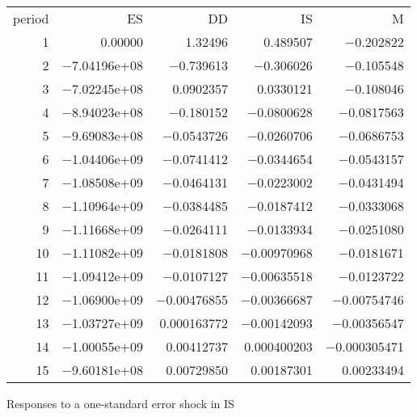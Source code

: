 \documentclass[11pt]{article}
\begin{document}
\begin{longtable}{rrrrr}
period &  ES &  DD &  IS &  M \\
1 & 0.00000 & 1.32496 & 0.489507 & $-$0.202822\\
2 & $-$7.04196\textrm{e+08} & $-$0.739613 & $-$0.306026 & $-$0.105548\\
3 & $-$7.02245\textrm{e+08} & 0.0902357 & 0.0330121 & $-$0.108046\\
4 & $-$8.94023\textrm{e+08} & $-$0.180152 & $-$0.0800628 & $-$0.0817563\\
5 & $-$9.69083\textrm{e+08} & $-$0.0543726 & $-$0.0260706 & $-$0.0686753\\
6 & $-$1.04406\textrm{e+09} & $-$0.0741412 & $-$0.0344654 & $-$0.0543157\\
7 & $-$1.08508\textrm{e+09} & $-$0.0464131 & $-$0.0223002 & $-$0.0431494\\
8 & $-$1.10964\textrm{e+09} & $-$0.0384485 & $-$0.0187412 & $-$0.0333068\\
9 & $-$1.11668\textrm{e+09} & $-$0.0264111 & $-$0.0133934 & $-$0.0251080\\
10 & $-$1.11082\textrm{e+09} & $-$0.0181808 & $-$0.00970968 & $-$0.0181671\\
11 & $-$1.09412\textrm{e+09} & $-$0.0107127 & $-$0.00635518 & $-$0.0123722\\
12 & $-$1.06900\textrm{e+09} & $-$0.00476855 & $-$0.00366687 & $-$0.00754746\\
13 & $-$1.03727\textrm{e+09} & 0.000163772 & $-$0.00142093 & $-$0.00356547\\
14 & $-$1.00055\textrm{e+09} & 0.00412737 & 0.000400203 & $-$0.000305471\\
15 & $-$9.60181\textrm{e+08} & 0.00729850 & 0.00187301 & 0.00233494\\
\end{longtable}

\vspace{1em}

Responses to a one-standard error shock in IS

\vspace{1em}
\end{document}
